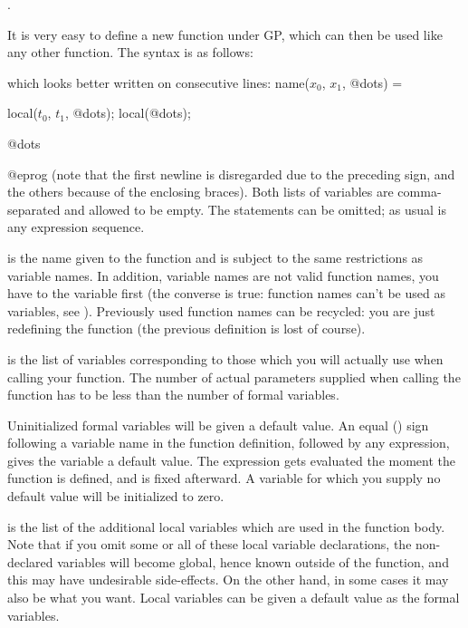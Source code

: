 .
\label{se:user_defined}

It is very easy to define a new function under GP, which can then be used
like any other function. The syntax is as follows:

\kbd{);} 

\noindent which looks better written on consecutive lines:
\bprogpart
name($x_0$, $x_1$, @dots) = 
{
  local($t_0$, $t_1$, @dots);
  local(@dots);

  @dots
}
@eprog
\noindent (note that the first newline is disregarded due to the preceding
\kbd{=} sign, and the others because of the enclosing braces). Both lists
of variables are comma-separated and allowed to be empty. The 
statements can be omitted; as usual  is any expression sequence.

 is the name given to the function and is subject to the same
restrictions as variable names. In addition, variable names are not valid
function names, you have to  the variable first (the converse is
true: function names can't be used as variables, see ).
Previously used function names can be recycled: you are just redefining the
function (the previous definition is lost of course).

 is the list of variables corresponding to
those which you will actually use when calling your function. The number of
actual parameters supplied when calling the function has to be less than the
number of formal variables.

Uninitialized formal variables will be given a default value. An equal
(\kbd{=}) sign following a variable name in the function definition,
followed by any expression, gives the variable a default value. The
expression gets evaluated the moment the function is defined, and is fixed
afterward. A variable for which you supply no default value will be
initialized to zero.

 is the list of the additional local variables
which are used in the function body. Note that if you omit some or all of
these local variable declarations, the non-declared variables will become
global, hence known outside of the function, and this may have undesirable
side-effects. On the other hand, in some cases it may also be what you want.
Local variables can be given a default value as the formal variables.

